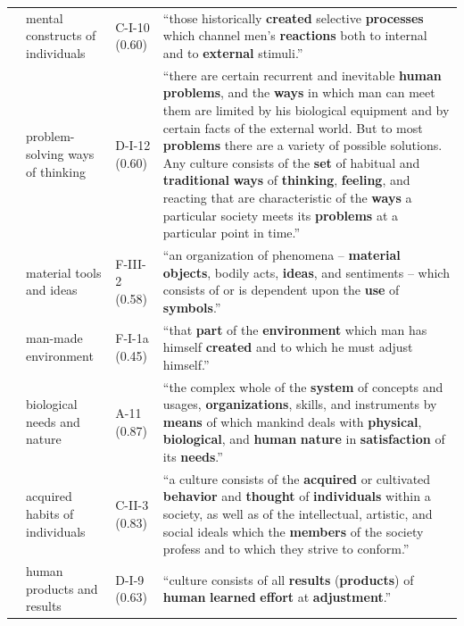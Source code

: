 \documentclass[11pt]{article}
\begin{document}
\begin{table}[p]
\begin{tabular}{c>{\raggedright\arraybackslash}p{2.8cm}>{\raggedright\arraybackslash}p{2.2cm}p{9.4cm}}
\addlinespace[2pt]
6 & mental constructs of individuals & C-I-10 (0.60) \newline \citealt{kluckhohnkelly1945a} & ``those historically \textbf{created} selective \textbf{processes} which channel men's \textbf{reactions} both to internal and to \textbf{external} stimuli.'' \\
\addlinespace[2pt]
7 & problem-solving ways of thinking & D-I-12 (0.60) \newline \citealt{kluckhohnleighton1946} & ``there are certain recurrent and inevitable \textbf{human} \textbf{problems}, and the \textbf{ways} in which man can meet them are limited by his biological equipment and by certain facts of the external world. But to most \textbf{problems} there are a variety of possible solutions. Any culture consists of the \textbf{set} of habitual and \textbf{traditional} \textbf{ways} of \textbf{thinking}, \textbf{feeling}, and reacting that are characteristic of the \textbf{ways} a particular society meets its \textbf{problems} at a particular point in time.'' \\
\addlinespace[2pt]
8 & material tools and ideas & F-III-2 (0.58) \newline \citealt{white1943} & ``an organization of phenomena -- \textbf{material} \textbf{objects}, bodily acts, \textbf{ideas}, and sentiments -- which consists of or is dependent upon the \textbf{use} of \textbf{symbols}.'' \\
\addlinespace[2pt]
9 & man-made environment & F-I-1a (0.45) \newline \citealt{willey1927b} & ``that \textbf{part} of the \textbf{environment} which man has himself \textbf{created} and to which he must adjust himself.'' \\
\addlinespace[2pt]
10 & biological needs and nature & A-11 (0.87) \newline \citealt{panunzio1939} & ``the complex whole of the \textbf{system} of concepts and usages, \textbf{organizations}, skills, and instruments by \textbf{means} of which mankind deals with \textbf{physical}, \textbf{biological}, and \textbf{human} \textbf{nature} in \textbf{satisfaction} of its \textbf{needs}.'' \\
\addlinespace[2pt]
11 & acquired habits of individuals & C-II-3 (0.83) \newline \citealt{bidney1942} & ``a culture consists of the \textbf{acquired} or cultivated \textbf{behavior} and \textbf{thought} of \textbf{individuals} within a society, as well as of the intellectual, artistic, and social ideals which the \textbf{members} of the society profess and to which they strive to conform.'' \\
\addlinespace[2pt]
12 & human products and results & D-I-9 (0.63) \newline \citealt{committee1941} & ``culture consists of all \textbf{results} (\textbf{products}) of \textbf{human} \textbf{learned} \textbf{effort} at \textbf{adjustment}.'' \\
\bottomrule
\end{tabular}
\end{table}
\end{document}
